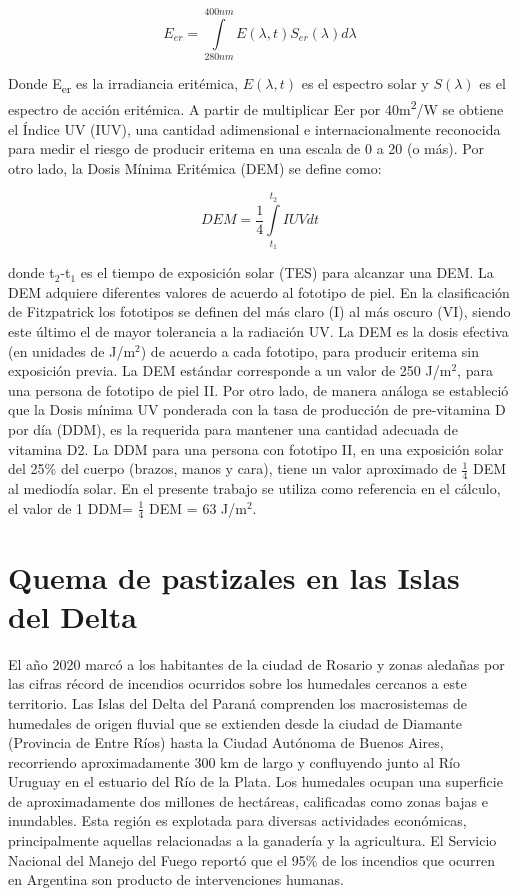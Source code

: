 \begin{equation*}
    E_{er} = \int\limits_{280nm}^{400nm} E(\lambda,t)S_{er} (\lambda) d\lambda \label{eq:eer}
\end{equation*}

Donde E\textsubscript{er} es la irradiancia eritémica, $E(\lambda,t)$ es el espectro solar y $S(\lambda)$ es el espectro de acción eritémica. A partir de multiplicar Eer por 40m\textsuperscript{2}/W se obtiene el Índice UV (IUV), una cantidad adimensional e internacionalmente reconocida para medir el riesgo de producir eritema en una escala de 0 a 20 (o más). Por otro lado, la Dosis Mínima Eritémica (DEM) se define como:

\begin{equation*}
    DEM = \frac{1}{4} \int\limits_{t_1}^{t_2}IUV dt
\end{equation*}

donde t$_2$-t$_1$ es el tiempo de exposición solar (TES) para alcanzar una DEM. La DEM adquiere diferentes valores de acuerdo al fototipo de piel. En la clasificación de Fitzpatrick los fototipos se definen del más claro (I) al más oscuro (VI), siendo este último el de mayor tolerancia a la radiación UV. La DEM es la dosis efectiva (en unidades de J/m$^2$) de acuerdo a cada fototipo, para producir eritema sin exposición previa\cite{CIE_2014}. La DEM estándar corresponde a un valor de 250 J/m$^2$, para una persona de fototipo de piel II\cite{CIE_2014}. Por otro lado, de manera análoga se estableció que la Dosis mínima UV ponderada con la tasa de producción de pre-vitamina D por día (DDM), es la requerida para mantener una cantidad adecuada de vitamina D2. La DDM para una persona con fototipo II, en una exposición solar del 25\% del cuerpo (brazos, manos y cara), tiene un valor aproximado de $\frac{1}{4}$ DEM al mediodía solar\cite{Dowdy_2010}. En el presente trabajo se utiliza como referencia en el cálculo, el valor de 1 DDM= $\frac{1}{4}$ DEM = 63 J/m$^2$.

\section*{Quema de pastizales en las Islas del Delta}

El año 2020 marcó a los habitantes de la ciudad de Rosario y zonas aledañas por las cifras récord de incendios ocurridos sobre los humedales cercanos a este territorio. Las Islas del Delta del Paraná comprenden los macrosistemas de humedales de origen fluvial que se extienden desde la ciudad de Diamante (Provincia de Entre Ríos) hasta la Ciudad Autónoma de Buenos Aires, recorriendo aproximadamente 300 km de largo y confluyendo junto al Río Uruguay en el estuario del Río de la Plata. Los humedales ocupan una superficie de aproximadamente dos millones de hectáreas, calificadas como zonas bajas e inundables\cite{acuario_del_rio_parana}. Esta región es explotada para diversas actividades económicas, principalmente aquellas relacionadas a la ganadería y la agricultura\cite{Galperin_2013}. El Servicio Nacional del Manejo del Fuego reportó que el 95\% de los incendios que ocurren en Argentina son producto de intervenciones humanas\cite{SNMF_2020}.

